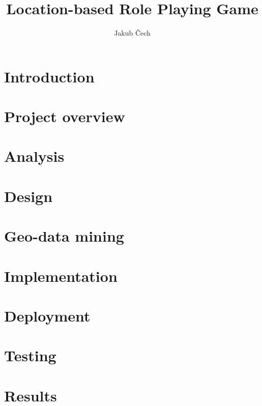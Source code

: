 \documentclass[thesis=B,english]{FITthesis}[2012/10/20]
\title{Location-based Role Playing Game}
\author{Jakub Čech} %
\begin{document}
	
	
	\chapter{Introduction}
	
	
	
	\chapter{Project overview}
	
	
	\chapter{Analysis}
	
	
	\chapter{Design}
	
	
	\chapter{Geo-data mining}
	
	
	\chapter{Implementation}
	
	
	\chapter{Deployment}
	
	
	\chapter{Testing}
	
	
	
	\chapter{Results}
	
	
	\printbibliography

	
	\appendix
	
\end{document}
